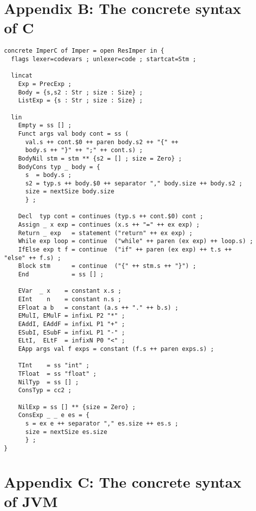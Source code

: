 \documentclass[12pt]{article}
\begin{document}
\section*{Appendix B: The concrete syntax of C}

\small
\begin{verbatim}
concrete ImperC of Imper = open ResImper in {
  flags lexer=codevars ; unlexer=code ; startcat=Stm ;

  lincat
    Exp = PrecExp ;
    Body = {s,s2 : Str ; size : Size} ;
    ListExp = {s : Str ; size : Size} ;

  lin
    Empty = ss [] ;
    Funct args val body cont = ss (
      val.s ++ cont.$0 ++ paren body.s2 ++ "{" ++ 
      body.s ++ "}" ++ ";" ++ cont.s) ;
    BodyNil stm = stm ** {s2 = [] ; size = Zero} ;
    BodyCons typ _ body = {
      s  = body.s ; 
      s2 = typ.s ++ body.$0 ++ separator "," body.size ++ body.s2 ;
      size = nextSize body.size
      } ;

    Decl  typ cont = continues (typ.s ++ cont.$0) cont ;
    Assign _ x exp = continues (x.s ++ "=" ++ ex exp) ;
    Return _ exp   = statement ("return" ++ ex exp) ;
    While exp loop = continue  ("while" ++ paren (ex exp) ++ loop.s) ;
    IfElse exp t f = continue  ("if" ++ paren (ex exp) ++ t.s ++ "else" ++ f.s) ;
    Block stm      = continue  ("{" ++ stm.s ++ "}") ;
    End            = ss [] ;
 
    EVar  _ x    = constant x.s ;
    EInt    n    = constant n.s ;
    EFloat a b   = constant (a.s ++ "." ++ b.s) ;
    EMulI, EMulF = infixL P2 "*" ;
    EAddI, EAddF = infixL P1 "+" ;
    ESubI, ESubF = infixL P1 "-" ;
    ELtI,  ELtF  = infixN P0 "<" ;
    EApp args val f exps = constant (f.s ++ paren exps.s) ;

    TInt    = ss "int" ;
    TFloat  = ss "float" ;
    NilTyp  = ss [] ;
    ConsTyp = cc2 ;

    NilExp = ss [] ** {size = Zero} ;
    ConsExp _ _ e es = {
      s = ex e ++ separator "," es.size ++ es.s ;
      size = nextSize es.size
      } ;
}
\end{verbatim}
\normalsize
\newpage


\section*{Appendix C: The concrete syntax of JVM}
\end{document}
